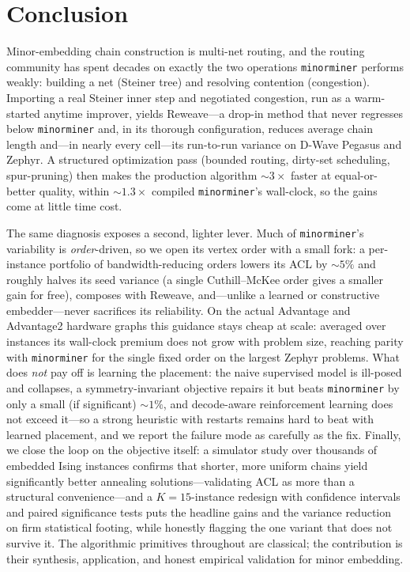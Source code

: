 \documentclass[acmsmall,anonymous,nonacm]{acmart}
\begin{document}
\section{Conclusion}
\label{sec:conclusion}

Minor-embedding chain construction is multi-net routing, and the routing
community has spent decades on exactly the two operations \texttt{minorminer}
performs weakly: building a net (Steiner tree) and resolving contention
(congestion). Importing a real Steiner inner step and negotiated congestion, run
as a warm-started anytime improver, yields Reweave---a drop-in method that never
regresses below \texttt{minorminer} and, in its thorough configuration, reduces
average chain length and---in nearly every cell---its run-to-run variance on
D-Wave Pegasus and Zephyr. A structured optimization pass (bounded routing,
dirty-set scheduling, spur-pruning) then makes the production algorithm
${\sim}3\times$ faster at equal-or-better quality, within ${\sim}1.3\times$
compiled \texttt{minorminer}'s wall-clock, so the gains come at little time cost.

The same diagnosis exposes a second, lighter lever. Much of
\texttt{minorminer}'s variability is \emph{order}-driven, so we open its vertex
order with a small fork: a per-instance portfolio of bandwidth-reducing orders
lowers its ACL by ${\sim}5\%$ and roughly halves its seed variance (a single
Cuthill--McKee order gives a smaller gain for free),
composes with Reweave, and---unlike a learned or constructive embedder---never
sacrifices its reliability. On the actual Advantage and Advantage2 hardware graphs
this guidance stays cheap at scale: averaged over instances its wall-clock premium
does not grow with problem size, reaching parity with \texttt{minorminer} for the
single fixed order on the largest Zephyr problems. What does \emph{not} pay off is learning the placement: the naive supervised
model is ill-posed and collapses, a symmetry-invariant objective repairs it but
beats \texttt{minorminer} by only a small (if significant) ${\sim}1\%$, and
decode-aware reinforcement learning does not exceed it---so a strong heuristic with
restarts remains hard to beat with learned placement, and we report the failure
mode as carefully as the fix. Finally, we close the loop on the objective itself: a
simulator study over thousands of embedded Ising instances confirms that shorter,
more uniform chains yield significantly better annealing solutions---validating ACL
as more than a structural convenience---and a $K{=}15$-instance redesign with
confidence intervals and paired significance tests puts the headline gains and the
variance reduction on firm statistical footing, while honestly flagging the one
variant that does not survive it. The algorithmic primitives throughout are
classical; the contribution is their synthesis, application, and honest empirical
validation for minor embedding.
\end{document}
